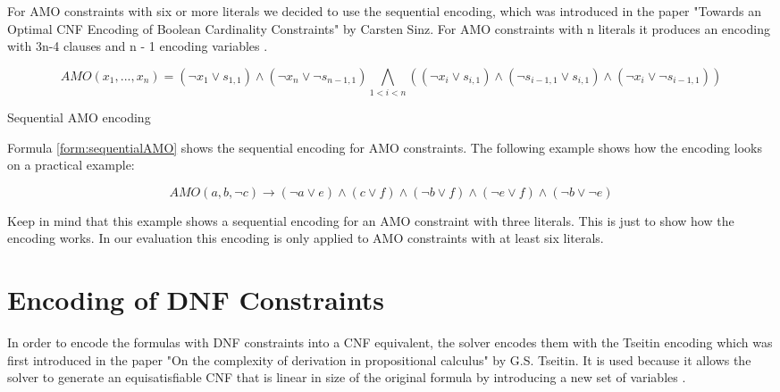 For AMO constraints with six or more literals we decided to use the sequential encoding, which was introduced in the paper "Towards an Optimal CNF Encoding of
Boolean Cardinality Constraints" \cite{sinz2005towards} by Carsten Sinz. For AMO constraints with n literals it produces an encoding with 3n-4 clauses and n - 1 encoding variables \cite{sinz2005towards}.

\begin{definition}[!htb]
\label{form:sequentialAMO}
\centering
\begin{leftbar}
\begin{displaymath}
AMO(x_1,...,x_n) = (\neg x_1 \vee s_{1,1}) \wedge (\neg x_n \vee \neg s_{n-1,1}) \bigwedge_{1 < i < n} ((\neg x_i \vee s_{i,1}) \wedge (\neg s_{i-1,1} \vee s_{i,1}) \wedge (\neg x_i \vee \neg s_{i-1,1}))
\end{displaymath}
\end{leftbar}
\caption{Sequential AMO encoding \cite{sinz2005towards}}
\end{definition}

Formula \ref{form:sequentialAMO} shows the sequential encoding for AMO constraints. The following example shows how the encoding looks on a practical example:

\begin{leftbar}
\begin{displaymath}
AMO(a,b,\neg c) \rightarrow (\neg a \vee e) \wedge (c \vee f) \wedge (\neg b \vee f) \wedge (\neg e \vee f) \wedge (\neg b \vee \neg e)
\end{displaymath}
\end{leftbar}

Keep in mind that this example shows a sequential encoding for an AMO constraint with three literals. This is just to show how the encoding works. In our evaluation this encoding is only applied to AMO constraints with at least six literals.

\section{Encoding of DNF Constraints}

In order to encode the formulas with DNF constraints into a CNF equivalent, the solver encodes them with the Tseitin encoding which was first introduced in the paper "On the complexity of derivation in propositional calculus" \cite{tseitin1983complexity} by G.S. Tseitin. It is used because it allows the solver to generate an equisatisfiable CNF that is linear in size of the original formula by introducing a new set of variables \cite{biere2009handbook}.

